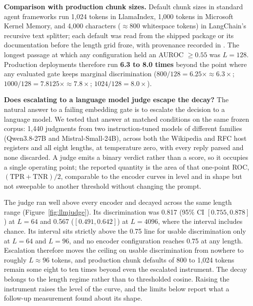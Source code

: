 \documentclass[11pt]{article}
\begin{document}
\textbf{Comparison with production chunk sizes.} Default chunk sizes in standard agent frameworks run 1,024 tokens in LlamaIndex, 1,000 tokens in Microsoft Kernel Memory, and 4,000 characters ($\approx 800$ whitespace tokens) in LangChain's recursive text splitter; each default was read from the shipped package or its documentation before the length grid froze, with provenance recorded in . The longest passage at which any configuration held an AUROC $\ge 0.55$ was $L = 128$. Production deployments therefore run \textbf{6.3 to 8.0 times} beyond the point where any evaluated gate keeps marginal discrimination ($800/128 = 6.25\times \approx 6.3\times$; $1000/128 = 7.8125\times \approx 7.8\times$; $1024/128 = 8.0\times$).

\textbf{Does escalating to a language model judge escape the decay?} The natural answer to a failing embedding gate is to escalate the decision to a language model. We tested that answer at matched conditions on the same frozen corpus: 1,440 judgments from two instruction-tuned models of different families (Qwen3.8-27B and Mistral-Small-24B), across both the Wikipedia and RFC host registers and all eight lengths, at temperature zero, with every reply parsed and none discarded. A judge emits a binary verdict rather than a score, so it occupies a single operating point; the reported quantity is the area of that one-point ROC, $(\mathrm{TPR} + \mathrm{TNR})/2$, comparable to the encoder curves in level and in shape but not sweepable to another threshold without changing the prompt.

The judge ran well above every encoder and decayed across the same length range (Figure~\ref{fig:llmjudge}). Its discrimination was 0.817 (95\% CI $[0.755, 0.878]$) at $L = 64$ and 0.567 ($[0.491, 0.642]$) at $L = 4096$, where the interval includes chance. Its interval sits strictly above the 0.75 line for usable discrimination only at $L = 64$ and $L = 96$, and no encoder configuration reaches 0.75 at any length. Escalation therefore moves the ceiling on usable discrimination from nowhere to roughly $L \approx 96$ tokens, and production chunk defaults of 800 to 1,024 tokens remain some eight to ten times beyond even the escalated instrument. The decay belongs to the length regime rather than to thresholded cosine. Raising the instrument raises the level of the curve, and the limits below report what a follow-up measurement found about its shape.
\end{document}
